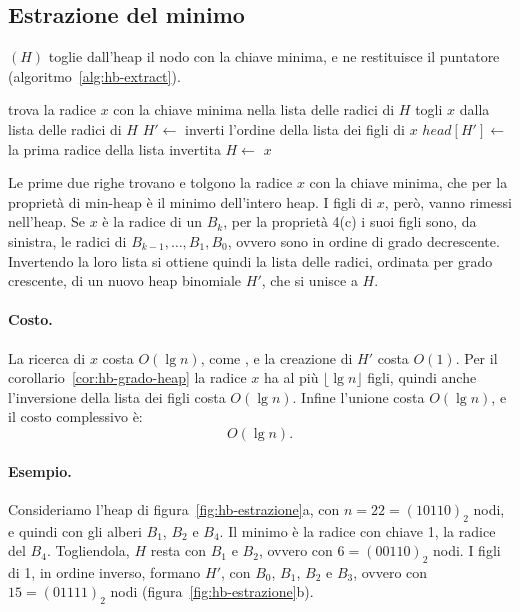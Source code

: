\subsection{Estrazione del minimo}\label{sec:hb-extract}
\BinomialHeapExtractMin$(H)$ toglie dall'heap il nodo con la chiave minima, e ne restituisce il puntatore (algoritmo~\ref{alg:hb-extract}).

\begin{algorithm}[htbp]
\caption{L'estrazione del nodo con la chiave minima: i figli della radice tolta formano un nuovo heap, che si unisce a quello di partenza.}\label{alg:hb-extract}
\begin{algorithmic}[1]
  \State trova la radice $x$ con la chiave minima nella lista delle radici di $H$
  \State togli $x$ dalla lista delle radici di $H$
  \State $H' \gets$ 
  \State inverti l'ordine della lista dei figli di $x$
  \State $\mathit{head}[H'] \gets$ la prima radice della lista invertita
  \State $H \gets$ 
  \State \Return $x$
\EndProcedure
\end{algorithmic}
\end{algorithm}

Le prime due righe trovano e tolgono la radice $x$ con la chiave minima, che per la proprietà di min-heap è il minimo dell'intero heap. I figli di $x$, però, vanno rimessi nell'heap. Se $x$ è la radice di un $B_k$, per la proprietà 4(c) i suoi figli sono, da sinistra, le radici di $B_{k-1}, \ldots, B_1, B_0$, ovvero sono in ordine di grado decrescente. Invertendo la loro lista si ottiene quindi la lista delle radici, ordinata per grado crescente, di un nuovo heap binomiale $H'$, che si unisce a $H$.

\paragraph{Costo.}
La ricerca di $x$ costa $O(\lg n)$, come \BinomialHeapMinimum{}, e la creazione di $H'$ costa $O(1)$. Per il corollario~\ref{cor:hb-grado-heap} la radice $x$ ha al più $\lfloor \lg n \rfloor$ figli, quindi anche l'inversione della lista dei figli costa $O(\lg n)$. Infine l'unione costa $O(\lg n)$, e il costo complessivo è:
\[
O(\lg n).
\]

\paragraph{Esempio.}
Consideriamo l'heap di figura~\ref{fig:hb-estrazione}a, con $n = 22 = (10110)_2$ nodi, e quindi con gli alberi $B_1$, $B_2$ e $B_4$. Il minimo è la radice con chiave 1, la radice del $B_4$. Togliendola, $H$ resta con $B_1$ e $B_2$, ovvero con $6 = (00110)_2$ nodi. I figli di 1, in ordine inverso, formano $H'$, con $B_0$, $B_1$, $B_2$ e $B_3$, ovvero con $15 = (01111)_2$ nodi (figura~\ref{fig:hb-estrazione}b).

